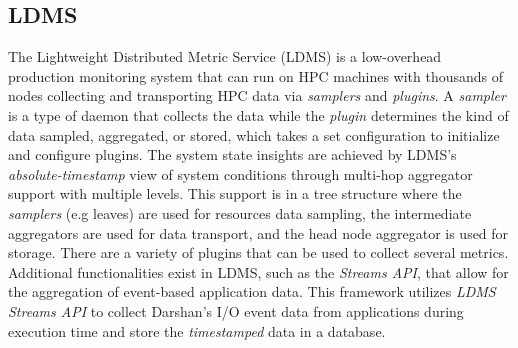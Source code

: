\subsection{LDMS}
The Lightweight Distributed Metric Service (LDMS) is a low-overhead production monitoring system that can run on HPC machines with thousands of nodes collecting and transporting HPC data via \emph{samplers} and \emph{plugins}. A \emph{sampler} is a type of daemon that collects the data while the \emph{plugin} determines the kind of data sampled, aggregated, or stored, which takes a set configuration to initialize and configure plugins. 
The system state insights are achieved by LDMS's \emph{absolute-timestamp} view of system conditions through multi-hop aggregator support with multiple levels. This support is in a tree structure where the \emph{samplers} (e.g leaves) are used for resources data sampling, the intermediate aggregators are used for data transport, and the head node aggregator is used for storage. There are a variety of plugins that can be used to collect several metrics.
Additional functionalities exist in LDMS, such as the \emph{Streams API}, that allow for the aggregation of event-based application data. This framework utilizes \emph{LDMS Streams API} to collect Darshan's I/O event data from applications during execution time and store the \emph{timestamped} data in a database.
